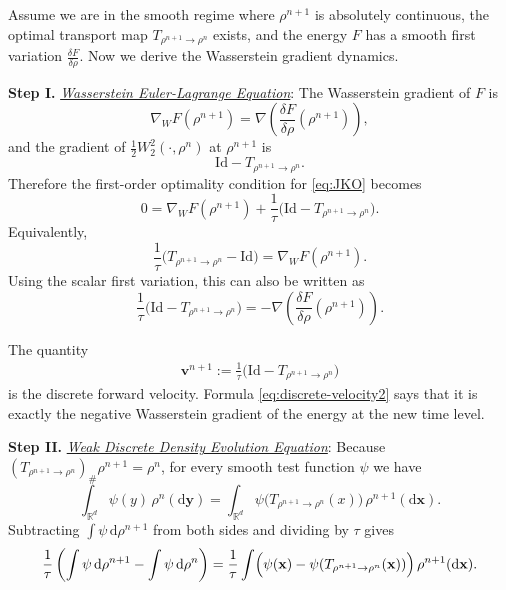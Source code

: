 \documentclass[11pt]{book}
\newcommand{\R}{\mathbb{R}}
\newcommand{\bx}{\mathbf x}
\newcommand{\by}{\mathbf y}
\newcommand{\bv}{\mathbf v}
\newcommand{\id}{\mathrm{Id}}
\newcommand{\dd}{\mathrm{d}}
\newcommand{\W}{W_2}
\newcommand{\gradw}{\nabla_{\!W}}
\newcommand{\deldrho}[1]{\frac{\delta #1}{\delta\rho}}
\begin{document}
Assume we are in the smooth regime where $\rho^{n+1}$ is absolutely continuous, the optimal transport map $T_{\rho^{n+1}\to \rho^n}$ exists, and the energy $F$ has a smooth first variation $\deldrho{F}$. Now we derive the Wasserstein gradient dynamics.

{\bf{Step I.}} \underline{\it{Wasserstein Euler-Lagrange Equation}}: The Wasserstein gradient of $F$ is
\[
\gradw F(\rho^{n+1}) = \nabla\!\left(\deldrho{F}(\rho^{n+1})\right),
\]
and the gradient of $\frac12 \W^2(\cdot,\rho^n)$ at $\rho^{n+1}$ is
\[
\id - T_{\rho^{n+1}\to \rho^n}.
\]
Therefore the first-order optimality condition for \eqref{eq:JKO} becomes
\begin{equation}
0 = \gradw F(\rho^{n+1}) + \frac{1}{\tau}\bigl(\id - T_{\rho^{n+1}\to \rho^n}\bigr).
\label{eq:EL-W}
\end{equation}
Equivalently,
\begin{equation}
\frac{1}{\tau}\bigl(T_{\rho^{n+1}\to \rho^n}-\id\bigr)=\gradw F(\rho^{n+1}).
\label{eq:discrete-velocity1}
\end{equation}
Using the scalar first variation, this can also be written as
\begin{equation}
\frac{1}{\tau}\bigl(\id-T_{\rho^{n+1}\to \rho^n}\bigr)
= -\nabla\!\left(\deldrho{F}(\rho^{n+1})\right).
\label{eq:discrete-velocity2}
\end{equation}

The quantity
\begin{align}\label{eqn:forward_velocity}
\bv^{n+1} := \frac{1}{\tau}\bigl(\id-T_{\rho^{n+1}\to \rho^n}\bigr)
\end{align}
is the discrete forward velocity. Formula \eqref{eq:discrete-velocity2} says that it is exactly the negative Wasserstein gradient of the energy at the new time level.


{\bf{Step II.}} \underline{\it{Weak Discrete Density Evolution Equation}}:
Because $(T_{\rho^{n+1}\to \rho^n})_{\#}\rho^{n+1}=\rho^n$, for every smooth test function $\psi$ we have
\begin{equation}
\int_{\R^d} \psi(y)\,\rho^n(\dd \by)
= \int_{\R^d} \psi\bigl(T_{\rho^{n+1}\to \rho^n}(x)\bigr)\,\rho^{n+1}(\dd \bx).
\label{eq:pushforward-test}
\end{equation}
Subtracting $\int \psi\,\dd\rho^{n+1}$ from both sides and dividing by $\tau$ gives
\begin{equation}
\frac{1}{\tau}\left(\int \psi\,\dd\rho^{n+1}-\int \psi\,\dd\rho^n\right)
=
\frac{1}{\tau}\int \Bigl(\psi(\bx)-\psi(T_{\rho^{n+1}\to \rho^n}(\bx))\Bigr)\,\rho^{n+1}(\dd \bx).
\label{eq:weak-discrete}
\end{equation}
\end{document}
